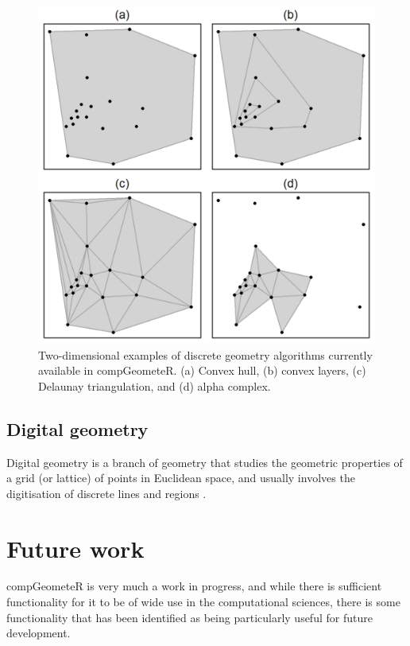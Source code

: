 \documentclass[12pt, a4paper]{article}
\begin{document}
\begin{figure}[ht]
\centering
\includegraphics{figures/figure-1/figure-1.png}
\caption{Two-dimensional examples of discrete geometry algorithms currently available in compGeometeR. (a) Convex hull, (b) convex layers, (c) Delaunay triangulation, and (d) alpha complex.}
\label{fig:euclidean-algorithms}
\end{figure}


\subsection{Digital geometry}

Digital geometry is a branch of geometry that studies the geometric properties of a grid (or lattice) of points in Euclidean space, and usually involves the digitisation of discrete lines and regions \citep{rosenfeld-1989}.




\section{Future work}

compGeometeR is very much a work in progress, and while there is sufficient functionality for it to be of wide use in the computational sciences, there is some functionality that has been identified as being particularly useful for future development.
\end{document}
